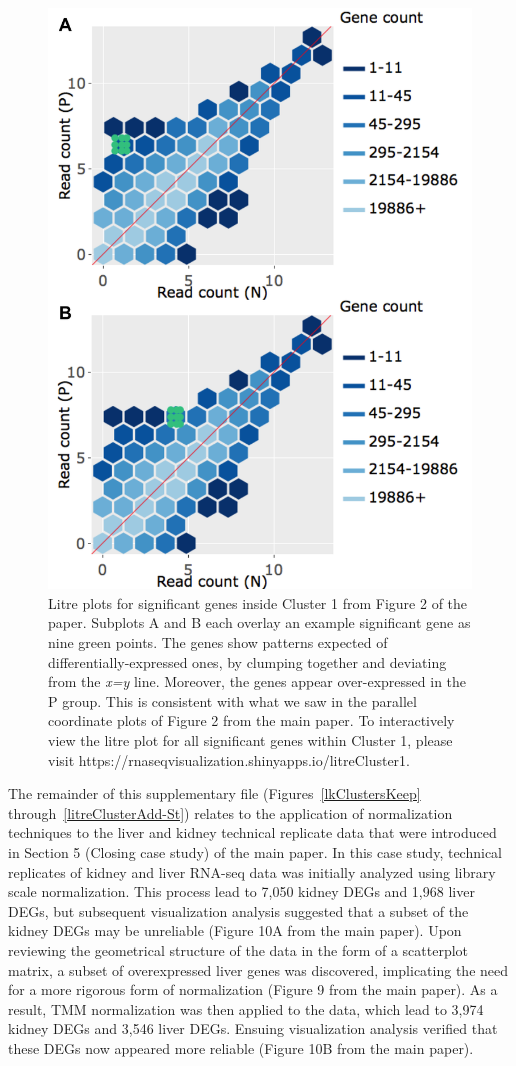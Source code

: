 \documentclass{article}
\begin{document}
  \clearpage
  \null 
  \begin{figure}[t!]
  \centerline{\includegraphics[width=0.7\columnwidth]{../MakeFigures/Dashboards/litreCluster1/litreCluster1.jpg}}
  \caption{Litre plots for significant genes inside Cluster 1 from Figure 2 of the paper. Subplots A and B each overlay an example significant gene as nine green points. The genes show patterns expected of differentially-expressed ones, by clumping together and deviating from the \textit{x=y} line. Moreover, the genes appear over-expressed in the P group. This is consistent with what we saw in the parallel coordinate plots of Figure 2 from the main paper. To interactively view the litre plot for all significant genes within Cluster 1, please visit https://rnaseqvisualization.shinyapps.io/litreCluster1.
  \label{litreCluster1}}
  \end{figure}   
  
  
  \clearpage
  The remainder of this supplementary file (Figures~\ref{lkClustersKeep} through~\ref{litreClusterAdd-St}) relates to the application of normalization techniques to the liver and kidney technical replicate data that were introduced in Section 5 (Closing case study) of the main paper. In this case study, technical replicates of kidney and liver RNA-seq data was initially analyzed using library scale normalization. This process lead to 7,050 kidney DEGs and 1,968 liver DEGs, but subsequent visualization analysis suggested that a subset of the kidney DEGs may be unreliable (Figure 10A from the main paper). Upon reviewing the geometrical structure of the data in the form of a scatterplot matrix, a subset of overexpressed liver genes was discovered, implicating the need for a more rigorous form of normalization (Figure 9 from the main paper). As a result, TMM normalization was then applied to the data, which lead to 3,974 kidney DEGs and 3,546 liver DEGs. Ensuing visualization analysis verified that these DEGs now appeared more reliable (Figure 10B from the main paper). \\
  
\end{document}
